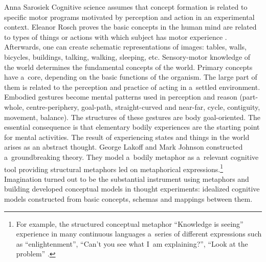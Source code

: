 \begin{artengenv}{Anna Sarosiek}
Cognitive science assumes that concept formation is related to specific motor programs motivated by perception and action in an experimental context. Eleanor Rosch proves the basic concepts in the human mind are related to types of things or actions with which subject has motor experience
\parencite[][]{rosch_principles_1999}. %
 Afterwards, one can create schematic representations of images: tables, walls, bicycles, buildings, talking, walking, sleeping, etc. Sensory-motor knowledge of the world determines the fundamental concepts of the world. Primary concepts have a~core, depending on the basic functions of the organism. The large part of them is related to the perception and practice of acting in a~settled environment. Embodied gestures become mental patterns used in perception and reason (part-whole, centre-periphery, goal-path, straight-curved and near-far, cycle, contiguity, movement, balance). The structures of these gestures are body goal-oriented. The essential consequence is that elementary bodily experiences are the starting point for mental activities. The result of experiencing states and things in the world arises as an abstract thought. George Lakoff and Mark Johnson constructed a~groundbreaking theory. They model a~bodily metaphor as a~relevant cognitive tool providing structural metaphors led on metaphorical expressions.\footnote{For example, the structured conceptual metaphor ``Knowledge is seeing'' experience in many continuous languages a~series of different expressions such as ``enlightenment'', ``Can’t you see what I~am explaining?'', ``Look at the problem'' 
\parencite[][]{lakoff_metaphors_2008}.%
} Imagination turned out to be the substantial instrument using metaphors and building developed conceptual models in thought experiments: idealized cognitive models constructed from basic concepts, schemas and mappings between them.


\end{artengenv}
